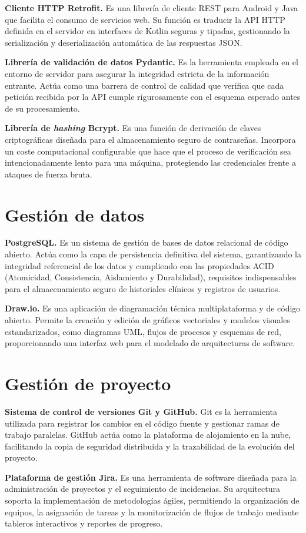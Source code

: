 \textbf{Cliente HTTP Retrofit.} Es una librería de cliente REST para Android y Java que facilita el consumo de servicios web. Su función es traducir la API HTTP definida en el servidor en interfaces de Kotlin seguras y tipadas, gestionando la serialización y deserialización automática de las respuestas JSON.

\textbf{Librería de validación de datos Pydantic.} Es la herramienta empleada en el entorno de servidor para asegurar la integridad estricta de la información entrante. Actúa como una barrera de control de calidad que verifica que cada petición recibida por la API cumple rigurosamente con el esquema esperado antes de su procesamiento.  \cite{pydantic_ref}

\textbf{Librería de \textit{hashing} Bcrypt.} Es una función de derivación de claves criptográficas diseñada para el almacenamiento seguro de contraseñas. Incorpora un coste computacional configurable que hace que el proceso de verificación sea intencionadamente lento para una máquina, protegiendo las credenciales frente a ataques de fuerza bruta.  \cite{bcrypt_tool}

\section{Gestión de datos}

\textbf{PostgreSQL.} Es un sistema de gestión de bases de datos relacional de código abierto. Actúa como la capa de persistencia definitiva del sistema, garantizando la integridad referencial de los datos y cumpliendo con las propiedades ACID (Atomicidad, Consistencia, Aislamiento y Durabilidad), requisitos indispensables para el almacenamiento seguro de historiales clínicos y registros de usuarios.  \cite{postgresql_ref}

\textbf{Draw.io.} Es una aplicación de diagramación técnica multiplataforma y de código abierto. Permite la creación y edición de gráficos vectoriales y modelos visuales estandarizados, como diagramas UML, flujos de procesos y esquemas de red, proporcionando una interfaz web para el modelado de arquitecturas de software.  \cite{draw_io_ref}

\section{Gestión de proyecto}

\textbf{Sistema de control de versiones Git y GitHub.} Git es la herramienta utilizada para registrar los cambios en el código fuente y gestionar ramas de trabajo paralelas. GitHub actúa como la plataforma de alojamiento en la nube, facilitando la copia de seguridad distribuida y la trazabilidad de la evolución del proyecto.  \cite{git_ref}

\textbf{Plataforma de gestión Jira.} Es una herramienta de software diseñada para la administración de proyectos y el seguimiento de incidencias. Su arquitectura soporta la implementación de metodologías ágiles, permitiendo la organización de equipos, la asignación de tareas y la monitorización de flujos de trabajo mediante tableros interactivos y reportes de progreso.
